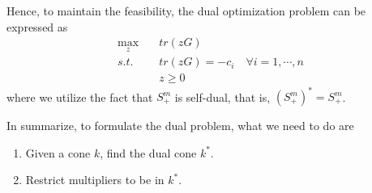 \begin{example}
Hence, to maintain the feasibility, the dual optimization problem can be expressed as
\begin{align*}
\max_z\quad &tr(zG)\\
s.t.\quad &tr(zG)=-c_i\quad \forall i=1,\cdots,n\\
&z\geq 0
\end{align*}
where we utilize the fact that $S_+^m$ is self-dual, that is, $(S_+^m)^*= S_+^m$.

In summarize, to formulate the dual problem, what we need to do are
\begin{enumerate}
	\item Given a cone $k$, find the dual cone $k^*$.
	
	\item Restrict multipliers to be in $k^*$.
\end{enumerate}

\end{example}

%






